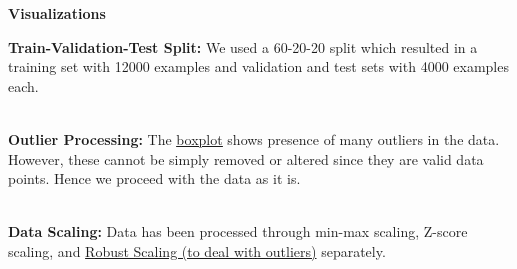 \documentclass[12pt]{report}
\begin{document}
\newpage
\noindent
{}
{}
\textbf{Visualizations}
\\

\null
\vspace*{\fill}
\noindent{}
\label{boxplot}
\vspace*{\fill}

\newpage
\null
\vspace*{\fill}
\noindent{}
\vspace*{\fill}

\newpage
\null
\vspace*{\fill}
\noindent{}
\vspace*{\fill}

\newpage
\null
\vspace*{\fill}
\noindent{}
\vspace*{\fill}

\newpage
\null
\vspace*{\fill}
\noindent{}
\vspace*{\fill}

\newpage
{}
{}
\noindent\textbf{Train-Validation-Test Split:}
We used a 60-20-20 split which resulted in a training set with 12000 examples and validation and test sets with 4000 examples each.
\\ \\

{}
\noindent\textbf{Outlier Processing:}
The \hyperref[boxplot]{\underline{boxplot}} shows presence of many outliers in the data. However, these cannot be simply removed or altered since they are valid data points. Hence we proceed with the data as it is.
\\ \\

{}
\noindent\textbf{Data Scaling:}
Data has been processed through min-max scaling, Z-score scaling, and \href{https://scikit-learn.org/stable/modules/generated/sklearn.preprocessing.RobustScaler.html}{Robust Scaling (to deal with outliers)} separately.
\\ \\
\end{document}
